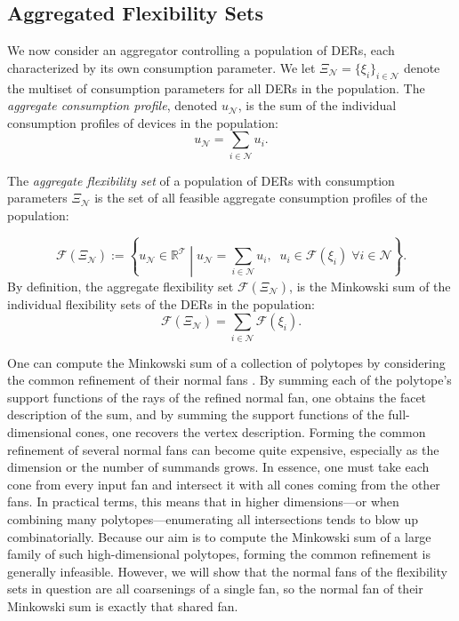 \subsection{Aggregated Flexibility Sets}
We now consider an aggregator controlling a population of DERs, each characterized by its own consumption parameter. We let $\Xi_\mathcal{N} = \{\xi_i\}_{i \in \mathcal{N}}$ denote the multiset of consumption parameters for all DERs in the population. 
The \textit{aggregate consumption profile}, denoted $u_\mathcal{N}$, is the sum of the individual consumption profiles of devices in the population:
\begin{equation}
    u_\mathcal{N} = \sum_{i \in \mathcal{N}} u_i.
\end{equation}
\begin{definition}\label{dfn:aggregate_flexibility_set}
    The \emph{aggregate flexibility set} of a population of DERs  with consumption parameters $\Xi_\mathcal{N}$ is the set of all feasible aggregate consumption profiles of the population:
\end{definition}
\begin{equation*}
    \mathcal{F}(\Xi_\mathcal{N}) := \left\{ u_\mathcal{N} \in \mathbb{R}^{\mathcal{T}} \middle| u_\mathcal{N} = \sum_{i \in \mathcal{N}} u_i,\;\; u_i \in \mathcal{F}(\xi_i) \; \forall i \in \mathcal{N} \right\}. 
\end{equation*}
By definition, the aggregate flexibility set $ \mathcal{F}(\Xi_\mathcal{N})$, is the Minkowski sum of the individual flexibility sets of the DERs in the population:
\begin{equation}
    \mathcal{F}(\Xi_\mathcal{N})  = \sum_{i \in \mathcal{N}} \mathcal{F}(\xi_i).
\end{equation} 

\begin{remark}
One can compute the Minkowski sum of a collection of polytopes by considering the common refinement of their normal fans \cite[Proposition 7.12]{Ziegler2012LecturesPolytopes}.
By summing each of the polytope’s support functions of the rays of the refined normal fan, one obtains the facet description of the sum, and by summing the support functions of the full-dimensional cones, one recovers the vertex description.
Forming the common refinement of several normal fans can become quite expensive, especially as the dimension or the number of summands grows. In essence, one must take each cone from every input fan and intersect it with all cones coming from the other fans. In practical terms, this means that in higher dimensions—or when combining many polytopes—enumerating all intersections tends to blow up combinatorially. Because our aim is to compute the Minkowski sum of a large family of such high-dimensional polytopes, forming the common refinement is generally infeasible. However, we will show that the normal fans of the flexibility sets in question are all coarsenings of a single fan, so the normal fan of their Minkowski sum is exactly that shared fan.
\end{remark}






